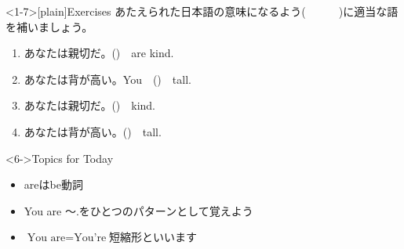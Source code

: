 \documentclass[aspectratio=169,xcolor={dvipsnames,table}]{beamer}
\newcommand{\myaudio}[1]{\href{#1}{\faVolumeUp}}
\begin{document}
\begin{frame}<1-7>[plain]{Exercises}
あたえられた日本語の意味になるよう(~~~~~~)に適当な語を補いましょう。

\begin{enumerate}
 \item あなたは親切だ。()~~are kind.
 \item あなたは背が高い。You~~()~~tall.
 \item あなたは親切だ。()~~kind.
 \item あなたは背が高い。()~~tall.
\end{enumerate}

 \begin{exampleblock}<6->{Topics for Today}
\begin{itemize}
 \item areはbe動詞
 \item You are 〜.をひとつのパターンとして覚えよう
 \item $\text{You are}=\text{You're}$\hfill{}短縮形といいます　
\end{itemize}
     \end{exampleblock}

\myaudio{audio/002_be_031.mp3}
\end{frame}

\end{document}
